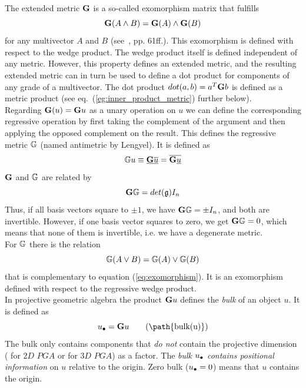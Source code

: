 The extended metric $\mathbf{G}$ is a so-called exomorphism matrix that fulfills
\begin{equation}
    \mathbf{G}(A \wedge B) = \mathbf{G}(A) \wedge \mathbf{G}(B)
    \label{eq:exomorphism}
\end{equation} for any multivector $A$ and $B$ (see~\cite{Lengyel_pga-illuminated:2024},
pp. 61ff.). This exomorphism is defined with respect to the wedge product. The wedge
product itself is defined independent of any metric. However, this property defines an
extended metric, and the resulting extended metric can in turn be used to define a dot
product for components of any grade of a multivector. The dot product $dot(a,b) = a^T
\mathbf{G} b$ is defined as a metric product (see eq.~(\ref{eg:inner_product_metric})
further below). \\

Regarding $\mathbf{G}(u) = \mathbf{G} u$ as a unary operation on $u$ we can define the
corresponding regressive operation by first taking the complement of the argument and then
applying the opposed complement on the result. This defines the regressive metric
$\mathbf{\mathbb{G}}$ (named antimetric by Lengyel). It is defined as
\begin{equation}
    \mathbf{\mathbb{G}} u \equiv \underline{\mathbf{G} \overline{u}}
    = \overline{\mathbf{G} \underline{u}}
\end{equation}
$\mathbf{G}$ and $\mathbf{\mathbb{G}}$ are related by 
\begin{equation}
    \mathbf{G} \mathbf{\mathbb{G}} = det(\mathfrak{g}) I_n
\end{equation}
Thus, if all basis vectors square to $\pm 1$, we have $\mathbf{G} \mathbf{\mathbb{G}} =
\pm I_n$, and both are invertible. However, if one basis vector squares to zero, we get
$\mathbf{G} \mathbf{\mathbb{G}} = 0$, which means that none of them is invertible, i.e. we
have a degenerate metric.\\

For $\mathbf{\mathbb{G}}$ there is the relation
\begin{equation}
    \mathbf{\mathbb{G}}(A \vee B) = \mathbf{\mathbb{G}}(A) \vee \mathbf{\mathbb{G}}(B)
    \label{eq:antiexomorphism}
\end{equation}
that is complementary to equation (\ref{eq:exomorphism}). It is an exomorphism defined
with respect to the regressive wedge product. \\

In projective geometric algebra the product $\mathbf{G} u$ defines the \emph{bulk} of
an object $u$. It is defined as
\begin{equation}
    \bulk{u} = \metric{G} u \qquad \textrm{(\path{bulk(u)})}
\end{equation}
The bulk only contains components that \emph{do not} contain the projective dimension
( for $2D$ $PGA$ or  for $3D$ $PGA$) as a factor. The \emph{bulk ${u}_\bullet$
contains positional information} on $u$ relative to the origin. Zero bulk (${u}_\bullet = 0$)
means that $u$ contains the origin.\\

